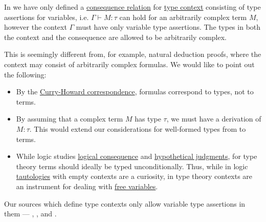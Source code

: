 \begin{remark}\label{rem:type_context_only_variables}
  In  we have only defined a \hyperref[def:consequence_relation]{consequence relation} for \hyperref[def:type_context]{type context} consisting of type assertions for variables, i.e. \( \Gamma \vdash M: \tau \) can hold for an arbitrarily complex term \( M \), however the context \( \Gamma \) must have only variable type assertions. The types in both the context and the consequence are allowed to be arbitrarily complex.

  This is seemingly different from, for example, natural deduction proofs, where the context may consist of arbitrarily complex formulas. We would like to point out the following:
  \begin{itemize}
    \item By the \hyperref[con:curry_howard_correspondence]{Curry-Howard correspondence}, formulas correspond to types, not to terms.

    \item By assuming that a complex term \( M \) has type \( \tau \), we must have a derivation of \( M: \tau \). This would extend our considerations for well-formed types from  to terms.

    \item While logic studies \hyperref[def:consequence_relation]{logical consequence} and \hyperref[con:hypothetical_judgment]{hypothetical judgments}, for type theory terms should ideally be typed unconditionally. Thus, while in logic \hyperref[def:propositional_tautology]{tautologies} with empty contexts are a curiosity, in type theory contexts are an instrument for dealing with \hyperref[def:lambda_variable_freeness]{free variables}.
  \end{itemize}

  Our sources which define type contexts only allow variable type assertions in them ---
  \cite[19]{MartinLöf1984IntuitionisticTypeTheory},
  \cite[def. 2A5]{Hindley1997BasicSTT},
  \cite[def. 5.1.5]{Barendregt1992LambdaCalculiWithTypes} and
  \cite[\S 4.1]{Mimram2020ProgramEqualsProof}.
\end{remark}

